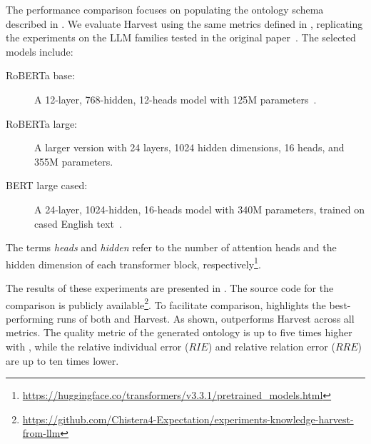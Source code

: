 The performance comparison focuses on populating the ontology schema described in .
%
We evaluate Harvest using the same metrics defined in , replicating the experiments on the \gls{LLM} families tested in the original paper~\cite{HaoTTNSZXH23}.
%
The selected models include:
%
\begin{description}
    \item[RoBERTa base:] A 12-layer, 768-hidden, 12-heads model with 125M parameters~\cite{roberta-2019}.
    \item[RoBERTa large:] A larger version with 24 layers, 1024 hidden dimensions, 16 heads, and 355M parameters.
    \item[BERT large cased:] A 24-layer, 1024-hidden, 16-heads model with 340M parameters, trained on cased English text~\cite{DBLP:conf/naacl/DevlinCLT19}.
\end{description}
%
The terms \emph{heads} and \emph{hidden} refer to the number of attention heads and the hidden dimension of each transformer block, respectively\footnote{\url{https://huggingface.co/transformers/v3.3.1/pretrained_models.html}}.

The results of these experiments are presented in .
%
The source code for the comparison is publicly available\footnote{\url{https://github.com/Chistera4-Expectation/experiments-knowledge-harvest-from-llm}}.
%
To facilitate comparison,  highlights the best-performing runs of both \llmfkg{} and Harvest.
%
As shown, \llmfkg{} outperforms Harvest across all metrics.
%
The quality metric of the generated ontology is up to five times higher with \llmfkg{}, while the relative individual error (\(RIE\)) and relative relation error (\(RRE\)) are up to ten times lower.


